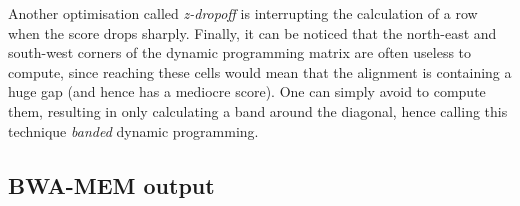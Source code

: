 Another optimisation called \emph{z-dropoff} is interrupting the calculation of a row when the score drops sharply. Finally, it can be noticed that the north-east and south-west corners of the dynamic programming matrix are often useless to compute, since reaching these cells would mean that the alignment is containing a huge gap (and hence has a mediocre score). One can simply avoid to compute them, resulting in only calculating a band around the diagonal, hence calling this technique \emph{banded} dynamic programming.


\subsection{BWA-MEM output}